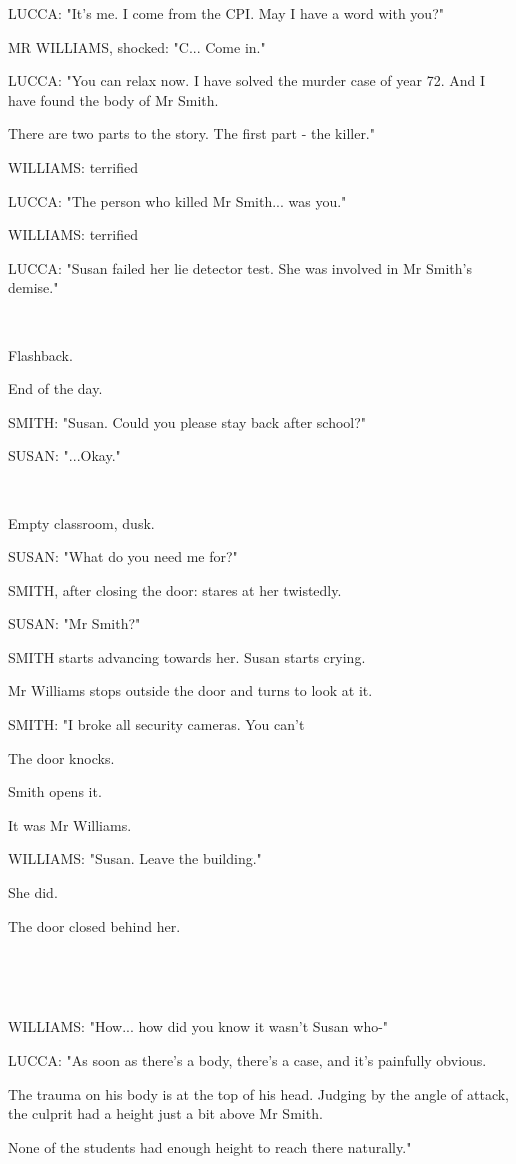 \documentclass[11pt]{article}
\begin{document}
LUCCA: "It's me. I come from the CPI.
May I have a word with you?"

MR WILLIAMS, shocked: "C... Come in."

LUCCA: "You can relax now. 
I have solved the murder case of year 72.
And I have found the body of Mr Smith.

There are two parts to the story. 
The first part - the killer."

WILLIAMS: terrified

LUCCA: "The person who killed Mr Smith... was you."

WILLIAMS: terrified

LUCCA: "Susan failed her lie detector test. 
She was involved in Mr Smith's demise."

\ 

Flashback.

End of the day. 

SMITH: "Susan. 
Could you please stay back after school?"

SUSAN: "...Okay."

\ 

Empty classroom, dusk.

SUSAN: "What do you need me for?"

SMITH, after closing the door: stares at her twistedly.

SUSAN: "Mr Smith?"

SMITH starts advancing towards her.
Susan starts crying.

Mr Williams stops outside the door and turns to look at it.

SMITH: "I broke all security cameras. 
You can't 

The door knocks.

Smith opens it. 

It was Mr Williams. 

WILLIAMS: "Susan. Leave the building."

She did.

The door closed behind her. 

\ 

\ 

WILLIAMS: "How... how did you know it wasn't Susan who-"

LUCCA: "As soon as there's a body, there's a case, and it's painfully obvious.

The trauma on his body is at the top of his head. 
Judging by the angle of attack, the culprit had a height just a bit above Mr Smith.

None of the students had enough height to reach there naturally."
\end{document}
